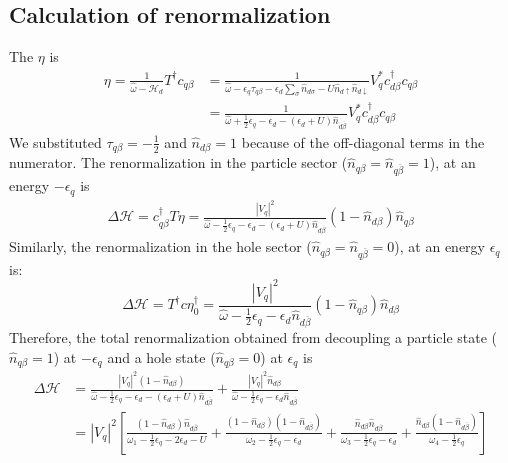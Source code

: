 \documentclass[twoside,11pt]{report}
\numberwithin{equation}{section}
\begin{document}
\subsection{Calculation of renormalization}
The \(\eta\) is
\begin{equation}\begin{aligned}
	\eta = \frac{1}{\hat \omega - \mathcal{H}_d}T^\dagger c_{q\beta} &= \frac{1}{\hat \omega - \epsilon_q \tau_{q\beta} - \epsilon_{d}\sum_\sigma  \hat n_{d\sigma} -  U \hat n_{d\uparrow} \hat n_{d\downarrow}}V_q^* c^\dagger_{d\beta}c_{q\beta}\\
							     &= \frac{1}{\hat \omega + \frac{1}{2}\epsilon_q - \epsilon_d - \left(\epsilon_d + U \right)\hat n_{d\overline\beta}}V_q^* c^\dagger_{d\beta}c_{q\beta}
\end{aligned}\end{equation}
We substituted \(\tau_{q\beta} = -\frac{1}{2}\) and \(\hat n_{d\beta} = 1\) because of the off-diagonal terms in the numerator.
The renormalization in the particle sector (\(\hat n_{q\beta} = \hat n_{q\overline\beta} = 1\)), at an energy \(-\epsilon_q\) is
\begin{equation}\begin{aligned}
\Delta \mathcal{H} = c^\dagger_{q\beta} T \eta= \frac{|V_q|^2}{\hat \omega - \frac{1}{2}\epsilon_q - \epsilon_d - \left(\epsilon_d + U \right)\hat n_{d\overline\beta}} \left(1 - \hat n_{d\beta}\right)\hat n_{q\beta} 
\end{aligned}\end{equation}
Similarly, the renormalization in the hole sector (\(\hat n_{q\beta} = \hat n_{q\overline\beta} = 0\)), at an energy \(\epsilon_q\) is:
\begin{equation}
	\Delta \mathcal{H} = T^\dagger c \eta_0^\dagger = \frac{|V_q|^2}{\hat \omega - \frac{1}{2}\epsilon_q - \epsilon_d\hat n_{d\overline\beta}}\left(1 - \hat n_{q\beta}\right)\hat n_{d\beta}
\end{equation}
Therefore, the total renormalization obtained from decoupling a particle state (\(\hat n_{q\beta}=1\)) at \(-\epsilon_q\) and a hole state (\(\hat n_{q\beta}=0\)) at \(\epsilon_q\) is
\begin{equation}\begin{aligned}
	\Delta \mathcal{H} &= \frac{|V_q|^2 \left(1 - \hat n_{d\beta}\right)}{\hat \omega - \frac{1}{2}\epsilon_q - \epsilon_d - \left(\epsilon_d + U \right)\hat n_{d\overline\beta}} + \frac{|V_q|^2\hat n_{d\beta}}{\hat \omega - \frac{1}{2}\epsilon_q - \epsilon_d \hat n_{d\overline\beta}}\\
		    &=|V_q|^2 \left[\frac{\left(1 - \hat n_{d\beta}\right)\hat n_{d\overline\beta}}{\omega_1 - \frac{1}{2}\epsilon_q - 2\epsilon_d - U} + \frac{\left(1 - \hat n_{d\beta}\right)\left( 1-\hat n_{d\overline\beta} \right)}{\omega_2 - \frac{1}{2}\epsilon_q - \epsilon_d} + \frac{\hat n_{d\beta} \hat n_{d\overline\beta}}{\omega_3 - \frac{1}{2}\epsilon_q - \epsilon_d} + \frac{\hat n_{d\beta}\left( 1- \hat n_{d\overline\beta}\right) }{\omega_4 - \frac{1}{2}\epsilon_q}\right]\\
\end{aligned}\end{equation}
\end{document}

